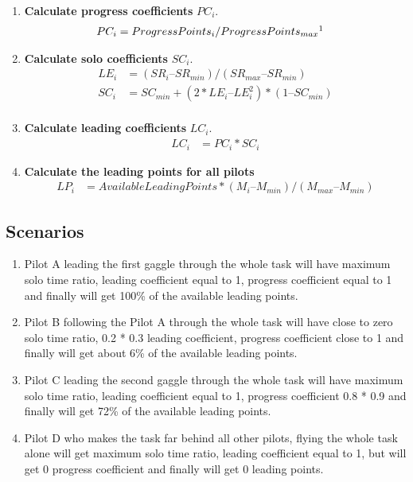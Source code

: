 \documentclass[gap.tex]{subfiles}
\begin{document}
\begin{enumerate}
    \item \textbf{Calculate progress coefficients} \(PC_i\).
        \begin{align*}
            PC_i &= ProgressPoints_i / ProgressPoints_{max}\footnotemark
        \end{align*}

    \item \textbf{Calculate solo coefficients} \(SC_i\).
        \begin{align*}
            LE_i &= (SR_i – SR_{min}) / (SR_{max} – SR_{min}) \\
            SC_i &= SC_{min} + (2*LE_i – LE_i^2) * (1 – SC_{min}) \\
        \end{align*}
            
    \item \textbf{Calculate leading coefficients} \(LC_i\).
        \begin{align*}
            LC_i &= PC_i * SC_i
        \end{align*}
            
    \item \textbf{Calculate the leading points for all pilots}
        \begin{align*}
            LP_i &= AvailableLeadingPoints * (M_i – M_{min}) / (M_{max} – M_{min} )
        \end{align*}
\end{enumerate}

\subsection{Scenarios}

\begin{enumerate}
    \item Pilot A leading the first gaggle through the whole task will have
        maximum solo time ratio, leading coefficient equal to 1, progress
        coefficient equal to 1 and finally will get 100\% of the available
        leading points.

    \item Pilot B following the Pilot A through the whole task will have close
        to zero solo time ratio, 0.2 * 0.3 leading coefficient, progress
        coefficient close to 1 and finally will get about 6\% of the available
        leading points.

    \item Pilot C leading the second gaggle through the whole task will have
        maximum solo time ratio, leading coefficient equal to 1, progress
        coefficient 0.8 * 0.9 and finally will get 72\% of the available
        leading points.

    \item Pilot D who makes the task far behind all other pilots, flying the
        whole task alone will get maximum solo time ratio, leading coefficient
        equal to 1, but will get 0 progress coefficient and finally will get
        0 leading points.
\end{enumerate}
\end{document}
